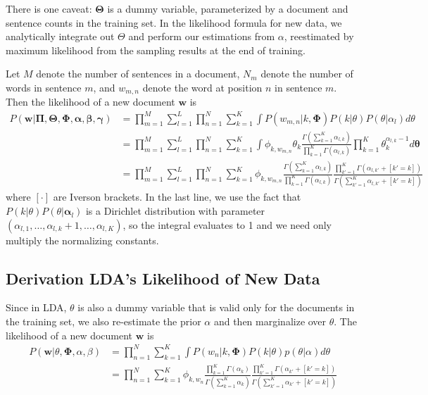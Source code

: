 \documentclass{article}
\begin{document}
There is one caveat: $\mathbf{\Theta}$ is a dummy variable,
parameterized by a document and sentence counts in the training
set. In the likelihood formula for new data, we analytically integrate
out $\Theta$ and perform our estimations from $\alpha$, reestimated
by maximum likelihood from the sampling results at the end of training.

Let $M$ denote the number of sentences in a document, $N_m$ denote
the number of words in sentence $m$, and $w_{m,n}$ denote the word
at position $n$ in sentence $m$. Then the likelihood of a new
document $\mathbf{w}$ is
\begin{equation} \label{eqn:subjlda-likelihood}
\begin{aligned}
P(\mathbf{w} | \mathbf{\Pi,\Theta,\Phi,\alpha,\beta,\gamma}) 
    &= \prod_{m=1}^M \sum_{l=1}^L \prod_{n=1}^N \sum_{k=1}^K \int P(w_{m,n} | k, \mathbf{\Phi} ) P( k | \theta ) P ( \theta | \alpha_l) d\theta \\
    &= \prod_{m=1}^M \sum_{l=1}^L \prod_{n=1}^N \sum_{k=1}^K \int \phi_{k,w_{m,n}} \theta_k \frac{\Gamma \left( \sum_{k=1}^K \alpha_{l,k} \right)}{\prod_{k=1}^K \Gamma(\alpha_{l,k})} \prod_{k=1}^K \theta_k^{\alpha_{l,k} - 1} d\mathbf{\theta} \\
    &= \prod_{m=1}^M \sum_{l=1}^L \prod_{n=1}^N \sum_{k=1}^K \phi_{k,w_{m,n}} \frac{\Gamma \left( \sum_{k=1}^K \alpha_{l,k} \right)}{\prod_{k=1}^K \Gamma(\alpha_{l,k})} \frac{\prod_{k'=1}^K \Gamma(\alpha_{l,k'} + \left[ k' = k \right])}{\Gamma \left( \sum_{k'=1}^K \alpha_{l,k'} + \left[ k' = k \right] \right)}
\end{aligned}
\end{equation}
where $[\cdot]$ are Iverson brackets. In the last line, we use the
fact that $P( k | \theta ) P ( \theta | \mathbf{\alpha}_l)$ is a
Dirichlet distribution with parameter $(\alpha_{l,1}, \ldots,
\alpha_{l,k} + 1, \ldots, \alpha_{l,K})$, so the integral evaluates
to 1 and we need only multiply the normalizing constants.

\subsection{Derivation LDA's Likelihood of New Data}
Since in LDA, $\theta$ is also a dummy variable that is valid only
for the documents in the training set, we also re-estimate the prior
$\alpha$ and then marginalize over $\theta$. The likelihood of a new
document $\mathbf{w}$ is
\begin{equation} \label{eqn:lda-likelihood}
\begin{aligned}
P(\mathbf{w} | \theta, \mathbf{\Phi}, \alpha, \beta )
 &= \prod_{n=1}^N \sum_{k=1}^K \int P(w_n | k, \mathbf{\Phi}) P(k | \theta) p(\theta | \alpha) d\theta \\
 &= \prod_{n=1}^N \sum_{k=1}^K \phi_{k,w_n} \frac{\prod_{k=1}^K \Gamma(\alpha_{k})}{\Gamma \left( \sum_{k=1}^K \alpha_{k} \right)} \frac{\prod_{k'=1}^K \Gamma(\alpha_{k'} + \left[ k' = k \right])}{\Gamma \left( \sum_{k'=1}^K \alpha_{k'} + \left[ k' = k \right] \right)}
\end{aligned}
\end{equation}
\end{document}

